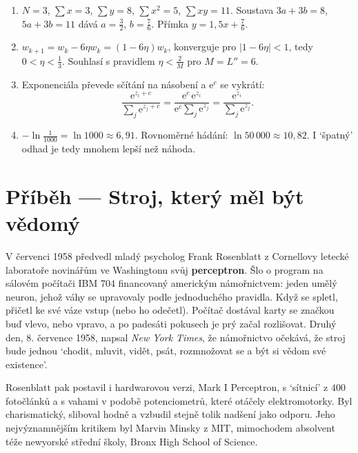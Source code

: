 \begin{solution}
  \begin{enumerate}[label=(\alph*)]
    \item $N = 3$, $\sum x = 3$, $\sum y = 8$, $\sum x^2 = 5$, $\sum xy = 11$. Soustava $3a + 3b = 8$, $5a + 3b = 11$ dává $a = \frac{3}{2}$, $b = \frac{7}{6}$. Přímka $y = 1{,}5x + \frac{7}{6}$.
    \item $w_{k+1} = w_k - 6\eta w_k = (1 - 6\eta)w_k$, konverguje pro $|1 - 6\eta| < 1$, tedy $0 < \eta < \frac{1}{3}$. Souhlasí s pravidlem $\eta < \frac{2}{M}$ pro $M = L'' = 6$.
    \item Exponenciála převede sčítání na násobení a $\mathrm{e}^c$ se vykrátí:
    \begin{equation*}
      \frac{\mathrm{e}^{z_i + c}}{\sum_j\mathrm{e}^{z_j + c}} = \frac{\mathrm{e}^c\,\mathrm{e}^{z_i}}{\mathrm{e}^c\sum_j\mathrm{e}^{z_j}} = \frac{\mathrm{e}^{z_i}}{\sum_j\mathrm{e}^{z_j}}.
    \end{equation*}
    \item $-\ln\frac{1}{1000} = \ln 1000\approx 6{,}91$. Rovnoměrné hádání: $\ln 50\,000\approx 10{,}82$. I `špatný' odhad je tedy mnohem lepší než náhoda.
  \end{enumerate}
\end{solution}

\section{Příběh --- Stroj, který měl být vědomý}

V červenci 1958 předvedl mladý psycholog Frank Rosenblatt z Cornellovy letecké laboratoře novinářům ve Washingtonu svůj \textbf{perceptron}. Šlo o program na sálovém počítači IBM 704 financovaný americkým námořnictvem: jeden umělý neuron, jehož váhy se upravovaly podle jednoduchého pravidla. Když se spletl, přičetl ke své váze vstup (nebo ho odečetl). Počítač dostával karty se značkou buď vlevo, nebo vpravo, a po padesáti pokusech je prý začal rozlišovat. Druhý den, 8. července 1958, napsal \textit{New York Times}, že námořnictvo očekává, že stroj bude jednou `chodit, mluvit, vidět, psát, rozmnožovat se a být si vědom své existence'.

Rosenblatt pak postavil i hardwarovou verzi, Mark I Perceptron, s `sítnicí' z $400$ fotočlánků a s vahami v podobě potenciometrů, které otáčely elektromotorky. Byl charismatický, sliboval hodně a vzbudil stejně tolik nadšení jako odporu. Jeho nejvýznamnějším kritikem byl Marvin Minsky z MIT, mimochodem absolvent téže newyorské střední školy, Bronx High School of Science.


